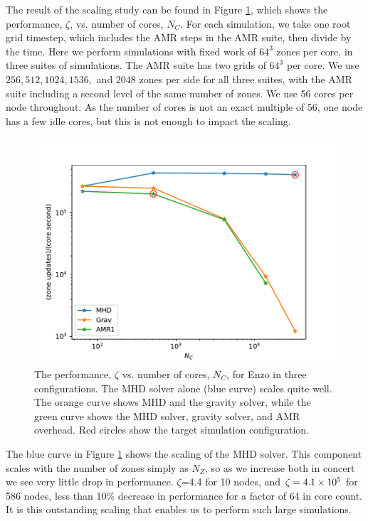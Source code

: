 The result of the scaling study can be found in Figure \ref{fig}, which shows
the performance, $\zeta$, vs. number of cores, $N_C$.  For each simulation, we
take one root grid timestep, which includes the AMR steps in the AMR suite, then
divide by the time.  Here we
perform simulations with fixed work of $64^3$ zones per core, in three suites of
simulations.  The AMR suite has two grids of $64^3$ per core.  We use $256, 512,
1024, 1536,$ and $2048$ zones per side for all three suites, with the AMR suite
including a second level of the same number of zones.  We use 56 cores per node
throughout.  As the number of cores is not an exact multiple of 56, one node has
a few idle cores, but this is not enough to impact the scaling.  


\begin{figure} \begin{center}
\includegraphics[width=\textwidth]{g57_zoneup.pdf}
\caption[ ]{The performance, $\zeta$ vs. number of cores, $N_C$,  for Enzo in
three configurations.  The MHD solver alone (blue curve) scales quite well.  The
orange curve shows MHD and the gravity solver, while the green curve shows the
MHD solver, gravity solver, and AMR overhead. Red circles show the target
simulation configuration.}
\label{fig} \end{center} \end{figure}

The blue curve in Figure \ref{fig} shows the scaling of the MHD solver.  This
component scales with the number of zones simply as $N_Z$, so as we increase
both in concert we see very little drop in performance.
 $\zeta$=4.4 for 10 nodes, and $\zeta=4.1\times {10^{5}}$ for 586 nodes, less
than 10\% decrease in performance for a factor of 64 in core count.  It is this
outstanding scaling that enables us to perform such large simulations.

